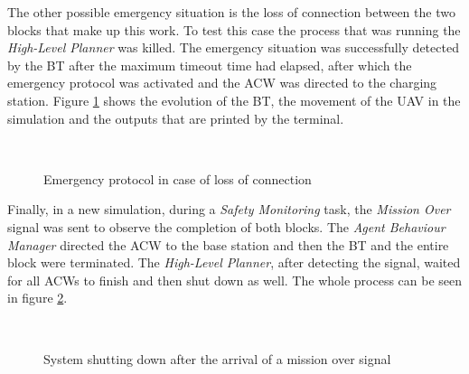 The other possible emergency situation is the loss of connection between the two blocks that make up this work. To test this case the process that was running the \emph{High-Level Planner} was killed. The emergency situation was successfully detected by the \gls{BT} after the maximum timeout time had elapsed, after which the emergency protocol was activated and the \gls{ACW} was directed to the charging station. Figure \ref{fig:event_AgentConnection} shows the evolution of the \gls{BT}, the movement of the \gls{UAV} in the simulation and the outputs that are printed by the terminal.

\begin{figure}[htbp]
    \centering
    \hfill
    \\
        \hfill
    \caption{Emergency protocol in case of loss of connection}
    \label{fig:event_AgentConnection}
\end{figure}

Finally, in a new simulation, during a \emph{Safety Monitoring} task, the \emph{Mission Over} signal was sent to observe the completion of both blocks. The \emph{Agent Behaviour Manager} directed the \gls{ACW} to the base station and then the \gls{BT} and the entire block were terminated. The \emph{High-Level Planner}, after detecting the signal, waited for all \glspl{ACW} to finish and then shut down as well. The whole process can be seen in figure \ref{fig:event_MissionOver}.

\begin{figure}[htbp]
    \centering
    \hfill
    \\
        \hfill
    \caption{System shutting down after the arrival of a mission over signal}
    \label{fig:event_MissionOver}
\end{figure}

